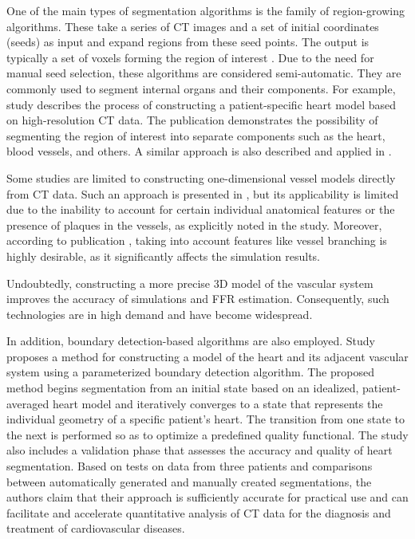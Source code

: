 \documentclass[default]{subfiles}
\begin{document}
One of the main types of segmentation algorithms is the family of region-growing algorithms. These take a series of CT
images and a set of initial coordinates (seeds) as input and expand regions from these seed points. The output is
typically a set of voxels forming the region of interest \cite{revol1997regiongrow}. Due to the need for manual seed
selection, these algorithms are considered semi-automatic. They are commonly used to segment internal organs and their
components. For example, study \cite{bajaj2015heart} describes the process of constructing a patient-specific heart
model based on high-resolution CT data. The publication demonstrates the possibility of segmenting the region of
interest into separate components such as the heart, blood vessels, and others. A similar approach is also described
and applied in \cite{mcqueen2005heart}.

Some studies are limited to constructing one-dimensional vessel models directly from CT data. Such an approach is
presented in \cite{carson2019benchmark}, but its applicability is limited due to the inability to account for certain
individual anatomical features or the presence of plaques in the vessels, as explicitly noted in the study. Moreover,
according to publication \cite{gamage2022octffr}, taking into account features like vessel branching is highly
desirable, as it significantly affects the simulation results.

Undoubtedly, constructing a more precise 3D model of the vascular system improves the accuracy of simulations and FFR
estimation. Consequently, such technologies are in high demand and have become widespread.

In addition, boundary detection-based algorithms are also employed. Study \cite{ecabert2011heart} proposes a method for
constructing a model of the heart and its adjacent vascular system using a parameterized boundary detection algorithm.
The proposed method begins segmentation from an initial state based on an idealized, patient-averaged heart model and
iteratively converges to a state that represents the individual geometry of a specific patient’s heart. The transition
from one state to the next is performed so as to optimize a predefined quality functional. The study also includes a
validation phase that assesses the accuracy and quality of heart segmentation. Based on tests on data from three
patients and comparisons between automatically generated and manually created segmentations, the authors claim that
their approach is sufficiently accurate for practical use and can facilitate and accelerate quantitative analysis of
CT data for the diagnosis and treatment of cardiovascular diseases.
\end{document}
